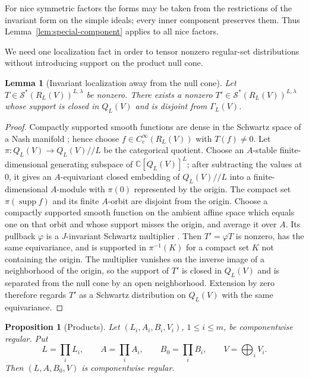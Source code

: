 \documentclass[10pt,a4paper]{amsart}
\numberwithin{equation}{section}
\newtheorem{proposition}[theorem]{Proposition}
\newtheorem{lemma}[theorem]{Lemma}
\newcommand{\C}{\mathbb C}
\newcommand{\supp}{\operatorname{supp}}
\newcommand{\cS}{\mathcal S}
\newcommand{\sslash}{/\!\!/}
\begin{document}
For nice symmetric factors the forms may be taken from the restrictions of the
invariant form on the simple ideals; every inner component preserves them.
Thus Lemma~\ref{lem:special-component} applies to all nice factors.

We need one localization fact in order to tensor nonzero regular-set
distributions without introducing support on the product null cone.

\begin{lemma}[Invariant localization away from the null cone]
\label{lem:localize-away}
Let $T\in\cS^*(R_L(V))^{L,\lambda}$ be nonzero.  There exists a nonzero
$T'\in\cS^*(R_L(V))^{L,\lambda}$ whose support is closed in $Q_L(V)$ and is
disjoint from $\Gamma_L(V)$.
\end{lemma}

\begin{proof}
Compactly supported smooth functions are dense in the Schwartz space of a Nash
manifold \cite{AGSchwartz}; hence choose $f\in C_c^\infty(R_L(V))$ with
$T(f)\ne0$.  Let $\pi:Q_L(V)\to Q_L(V)\sslash L$ be the categorical quotient.
Choose an $A$-stable finite-dimensional generating subspace of
$\C[Q_L(V)]^L$; after subtracting the values at $0$, it gives an
$A$-equivariant closed embedding of $Q_L(V)\sslash L$ into a
finite-dimensional $A$-module with $\pi(0)$ represented by the origin.  The compact set $\pi(\supp f)$ and its finite $A$-orbit are
disjoint from the origin.  Choose a compactly supported smooth function on the
ambient affine space which equals one on that orbit and whose support misses
the origin, and average it over $A$.  Its pullback $\varphi$ is a
$J$-invariant Schwartz multiplier \cite{AGSchwartz}.  Then
$T'=\varphi T$ is nonzero, has the same equivariance, and is supported in
$\pi^{-1}(K)$ for a compact set $K$ not containing the origin.  The multiplier
vanishes on the inverse image of a neighborhood of the origin, so the support
of $T'$ is closed in $Q_L(V)$ and is separated from the null cone by an open
neighborhood.  Extension by zero therefore regards $T'$ as a Schwartz
distribution on $Q_L(V)$ with the same equivariance.
\end{proof}

\begin{proposition}[Products]\label{prop:component-product}
Let $(L_i,A_i,B_i,V_i)$, $1\leq i\leq m$, be componentwise regular.  Put
\[
 L=\prod_iL_i,\qquad A=\prod_iA_i,\qquad B_0=\prod_iB_i,
 \qquad V=\bigoplus_iV_i.
\]
Then $(L,A,B_0,V)$ is componentwise regular.
\end{proposition}
\end{document}
